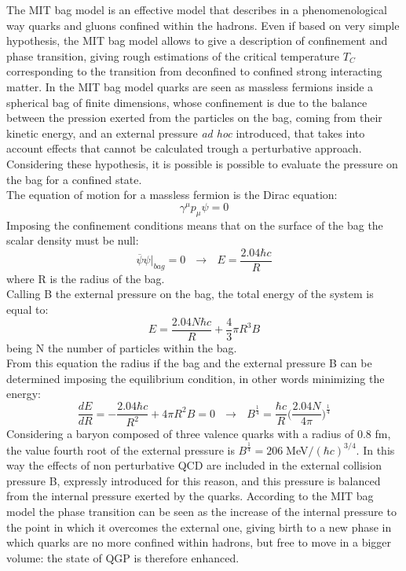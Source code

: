The MIT bag model is an effective model that describes in a phenomenological way quarks and gluons confined within the hadrons. Even if based on very simple hypothesis, the MIT bag model allows to give a description of confinement and phase transition, giving rough estimations of the critical temperature $T_{C}$ corresponding to the transition from deconfined to confined strong interacting matter. In the MIT bag model quarks are seen as massless fermions inside a spherical bag of finite dimensions, whose confinement is due to the balance between the pression exerted from the particles on the bag, coming from their kinetic energy, and an external pressure \textit{ad hoc} introduced, that takes into account effects that cannot be calculated trough a perturbative approach. Considering these hypothesis, it is possible is possible to evaluate the pressure on the bag for a confined state.\\
The equation of motion for a massless fermion is the Dirac equation:
%
\begin{equation}
  \gamma^{\mu}p_{\mu}\psi=0
\end{equation}
%
Imposing the confinement conditions means that on the surface of the bag the scalar density must be null:
%
\begin{equation}
  \overbar{\psi}\psi \Big|_{bag} = 0 \ \ \ \longrightarrow \ \ \ E = \frac{2.04 \hbar c}{R}
\end{equation}
%
where R is the radius of the bag.\\
Calling B the external pressure on the bag, the total energy of the system is equal to:
%
\begin{equation}
  E = \frac{2.04N \hbar c}{R} + \frac{4}{3} \pi R^{3} B
\end{equation}
%
being N the number of particles within the bag.\\
From this equation the radius if the bag and the external pressure B can be determined imposing the equilibrium condition, in other words minimizing the energy:
%
\begin{equation}
  \frac{dE}{dR} = -\frac{2.04 \hbar c}{R^{2}} + 4 \pi R^{2} B = 0 \ \ \ \longrightarrow \ \ \ B^{\frac{1}{4}} = \frac{\hbar c}{R}\Big(\frac{2.04N}{4\pi}\Big)^{\frac{1}{4}}
\end{equation}
%
Considering a baryon composed of three valence quarks with a radius of 0.8 fm, the value fourth root of the external pressure is $B^{\frac{1}{4}} = 206 \; $MeV$ / (\hbar c)^{3/4}$. In this way the effects of non perturbative QCD are included in the external collision pressure B, expressly introduced for this reason, and this pressure is balanced from the internal pressure exerted by the quarks. According to the MIT bag model the phase transition can be seen as the increase of the internal pressure to the point in which it overcomes the external one, giving birth to a new phase in which quarks are no more confined within hadrons, but free to move in a bigger volume: the state of QGP is therefore enhanced.\\
